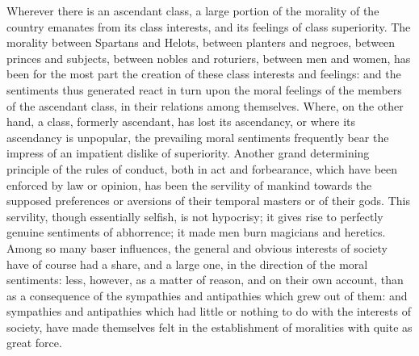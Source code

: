 \documentclass[11pt,openany]{book}
\begin{document}
Wherever there is an ascendant class, a large portion of the morality of the country emanates from its class interests, and its feelings of class superiority. The morality between Spartans and Helots, between planters and negroes, between princes and subjects, between nobles and roturiers, between men and women, has been for the most part the creation of these class interests and feelings: and the sentiments thus generated react in turn upon the moral feelings of the members of the ascendant class, in their relations among themselves. Where, on the other hand, a class, formerly ascendant, has lost its ascendancy, or where its ascendancy is unpopular, the prevailing moral sentiments frequently bear the impress of an impatient dislike of superiority. Another grand determining principle of the rules of conduct, both in act and forbearance, which have been enforced by law or opinion, has been the servility of mankind towards the supposed preferences or aversions of their temporal masters or of their gods. This servility, though essentially selfish, is not hypocrisy; it gives rise to perfectly genuine sentiments of abhorrence; it made men burn magicians and heretics. Among so many baser influences, the general and obvious interests of society have of course had a share, and a large one, in the direction of the moral sentiments: less, however, as a matter of reason, and on their own account, than as a consequence of the sympathies and antipathies which grew out of them: and sympathies and antipathies which had little or nothing to do with the interests of society, have made themselves felt in the establishment of moralities with quite as great force.
\end{document}
